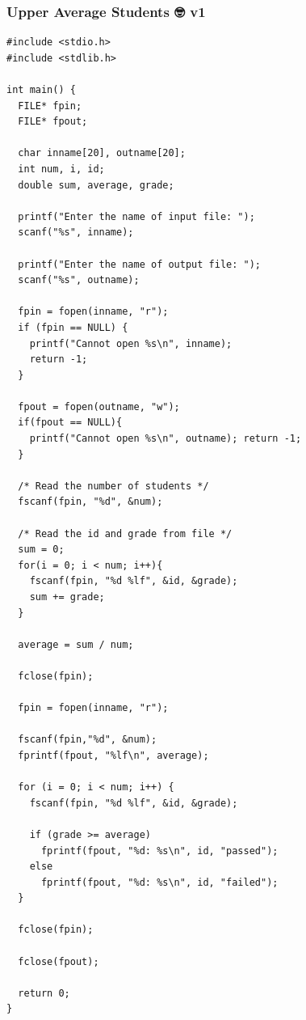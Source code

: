 \documentclass{../c-lecture}
\begin{document}
\begin{frame}[fragile]
  \frametitle{Upper Average Students 🤓 v1}
  \tiny
  \begin{verbatim}
#include <stdio.h>
#include <stdlib.h>

int main() {
  FILE* fpin;
  FILE* fpout;

  char inname[20], outname[20];
  int num, i, id;
  double sum, average, grade;

  printf("Enter the name of input file: ");
  scanf("%s", inname);

  printf("Enter the name of output file: ");
  scanf("%s", outname);

  fpin = fopen(inname, "r");
  if (fpin == NULL) {
    printf("Cannot open %s\n", inname);
    return -1;
  }

  fpout = fopen(outname, "w");
  if(fpout == NULL){
    printf("Cannot open %s\n", outname); return -1;
  }

  /* Read the number of students */
  fscanf(fpin, "%d", &num);

  /* Read the id and grade from file */
  sum = 0;
  for(i = 0; i < num; i++){
    fscanf(fpin, "%d %lf", &id, &grade);
    sum += grade;
  }

  average = sum / num;

  fclose(fpin);

  fpin = fopen(inname, "r");

  fscanf(fpin,"%d", &num);
  fprintf(fpout, "%lf\n", average);

  for (i = 0; i < num; i++) {
    fscanf(fpin, "%d %lf", &id, &grade);

    if (grade >= average)
      fprintf(fpout, "%d: %s\n", id, "passed");
    else
      fprintf(fpout, "%d: %s\n", id, "failed");
  }

  fclose(fpin);

  fclose(fpout);

  return 0;
}
  \end{verbatim}
\end{frame}
\end{document}
